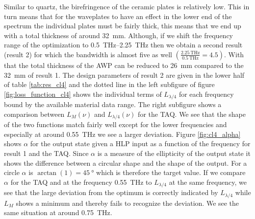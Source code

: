 Similar to quartz, the birefringence of the ceramic plates is relatively low. This in turn means that for the waveplates to have an effect in the lower end of the spectrum the individual plates must be fairly thick, this means that we end up with a total thickness of around \SI{32}{\milli \meter}. Although, if we shift the frequency range of the optimization to \SIrange[range-phrase=-, range-units=single]{0.5}{2.25}{\tera \hertz} then we obtain a second result (result 2) for which the bandwidth is almost five as well $\left(\frac{\SI{2.25}{\tera \hertz}}{\SI{0.5}{\tera \hertz}}=4.5\right)$. With that the total thickness of the AWP can be reduced to \SI{26}{\milli \meter} compared to the \SI{32}{\milli \meter} of result 1. The design parameters of result 2 are given in the lower half of table \ref{tab:res_cl4} and the dotted line in the left subfigure of figure \ref{fig:loss_function_cl4} shows the individual terms of $L_{\lambda/4}$ for each frequency bound by the available material data range. The right subfigure shows a comparison between $L_M(\nu)$ and $L_{\lambda/4}(\nu)$ for the TAQ. We see that the shape of the two functions match fairly well except for the lower frequencies and especially at around \SI{0.55}{\tera \hertz} we see a larger deviation. Figure \ref{fig:cl4_alpha} shows $\alpha$ for the output state given a HLP input as a function of the frequency for result 1 and the TAQ. Since $\alpha$ is a measure of the ellipticity of the output state it shows the difference between a circular shape and the shape of the output. For a circle $\alpha$ is $\arctan(1)=\SI{45}{\degree}$ which is therefore the target value. If we compare $\alpha$ for the TAQ and at the frequency \SI{0.55}{\tera \hertz} to $L_{\lambda/4}$ at the same frequency, we see that the large deviation from the optimum is correctly indicated by $L_{\lambda/4}$ while $L_M$ shows a minimum and thereby fails to recognize the deviation. We see the same situation at around \SI{0.75}{\tera \hertz}.

